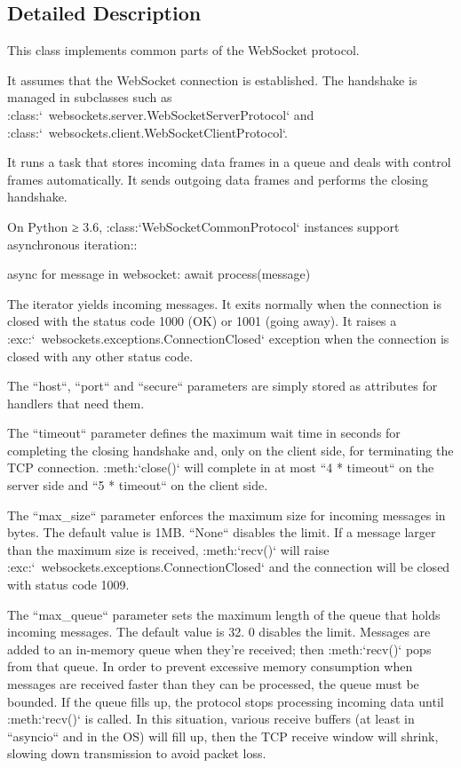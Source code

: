 \subsection{Detailed Description}
\begin{DoxyVerb}This class implements common parts of the WebSocket protocol.

It assumes that the WebSocket connection is established. The handshake is
managed in subclasses such as
:class:`~websockets.server.WebSocketServerProtocol` and
:class:`~websockets.client.WebSocketClientProtocol`.

It runs a task that stores incoming data frames in a queue and deals with
control frames automatically. It sends outgoing data frames and performs
the closing handshake.

On Python ≥ 3.6, :class:`WebSocketCommonProtocol` instances support
asynchronous iteration::

    async for message in websocket:
        await process(message)

The iterator yields incoming messages. It exits normally when the
connection is closed with the status code 1000 (OK) or 1001 (going away).
It raises a :exc:`~websockets.exceptions.ConnectionClosed` exception when
the connection is closed with any other status code.

The ``host``, ``port`` and ``secure`` parameters are simply stored as
attributes for handlers that need them.

The ``timeout`` parameter defines the maximum wait time in seconds for
completing the closing handshake and, only on the client side, for
terminating the TCP connection. :meth:`close()` will complete in at most
``4 * timeout`` on the server side and ``5 * timeout`` on the client side.

The ``max_size`` parameter enforces the maximum size for incoming messages
in bytes. The default value is 1MB. ``None`` disables the limit. If a
message larger than the maximum size is received, :meth:`recv()` will
raise :exc:`~websockets.exceptions.ConnectionClosed` and the connection
will be closed with status code 1009.

The ``max_queue`` parameter sets the maximum length of the queue that holds
incoming messages. The default value is 32. 0 disables the limit. Messages
are added to an in-memory queue when they're received; then :meth:`recv()`
pops from that queue. In order to prevent excessive memory consumption when
messages are received faster than they can be processed, the queue must be
bounded. If the queue fills up, the protocol stops processing incoming data
until :meth:`recv()` is called. In this situation, various receive buffers
(at least in ``asyncio`` and in the OS) will fill up, then the TCP receive
window will shrink, slowing down transmission to avoid packet loss.


\end{DoxyVerb}
